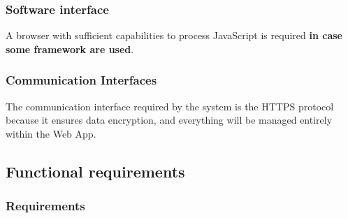 \documentclass{article}
\begin{document}
\subsubsection{Software interface}
A browser with sufficient capabilities to process JavaScript is required \textbf{in case some framework are used}.

\subsubsection{Communication Interfaces}
The communication interface required by the system is the HTTPS protocol because it ensures data encryption, and everything will be managed entirely within the Web App.

\subsection{Functional requirements}

\subsubsection{Requirements}
\end{document}
